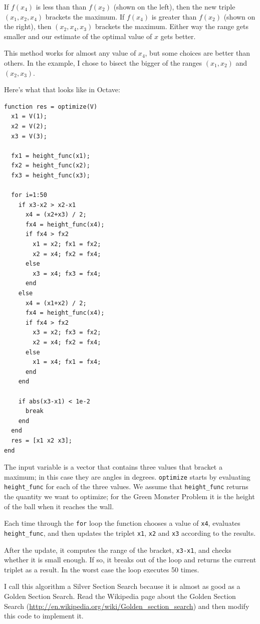 \documentclass{book}
\begin{document}
If $f(x_4)$ is less than than $f(x_2)$ (shown on the left), then the
new triple $(x_1, x_2, x_4)$ brackets the maximum. If $f(x_4)$ is
greater than $f(x_2)$ (shown on the right), then $(x_2, x_4, x_3)$
brackets the maximum. Either way the range gets smaller and our
estimate of the optimal value of $x$ gets better.

This method works for almost any value of $x_4$, but some choices
are better than others. In the example, I chose to bisect the
bigger of the ranges $(x_1, x_2)$ and $(x_2, x_3)$.

Here's what that looks like in Octave:

\begin{verbatim}
function res = optimize(V)
  x1 = V(1);
  x2 = V(2);
  x3 = V(3);
  
  fx1 = height_func(x1);
  fx2 = height_func(x2);
  fx3 = height_func(x3);
  
  for i=1:50
    if x3-x2 > x2-x1
      x4 = (x2+x3) / 2;
      fx4 = height_func(x4);
      if fx4 > fx2
        x1 = x2; fx1 = fx2;
        x2 = x4; fx2 = fx4;
      else
        x3 = x4; fx3 = fx4;
      end
    else
      x4 = (x1+x2) / 2;
      fx4 = height_func(x4);
      if fx4 > fx2
        x3 = x2; fx3 = fx2;
        x2 = x4; fx2 = fx4;
      else
        x1 = x4; fx1 = fx4;
      end
    end

    if abs(x3-x1) < 1e-2
      break
    end
  end
  res = [x1 x2 x3];
end
\end{verbatim}

The input variable is a vector that contains three values that bracket
a maximum; in this case they are angles in degrees. {\tt optimize}
starts by evaluating {\tt height\_func} for each of the three values.
We assume that {\tt height\_func} returns the quantity we want to
optimize; for the Green Monster Problem it is the height of
the ball when it reaches the wall.

Each time through the {\tt for} loop the function chooses a value
of {\tt x4}, evaluates {\tt height\_func}, and then updates the
triplet {\tt x1}, {\tt x2} and {\tt x3} according to the results.

After the update, it computes the range of the bracket, {\tt x3-x1},
and checks whether it is small enough. If so, it breaks out of
the loop and returns the current triplet as a result. In the
worst case the loop executes 50 times.

\begin{ex}
I call this algorithm a Silver Section Search because it is almost as
good as a Golden Section Search. Read the Wikipedia page about the
Golden Section Search
(\url{http://en.wikipedia.org/wiki/Golden_section_search}) and then
modify this code to implement it.
\end{ex}
\end{document}
